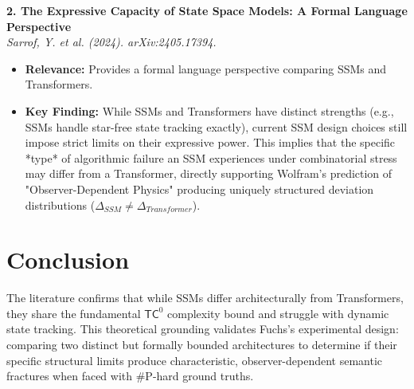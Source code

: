 \documentclass[12pt,a4paper]{article}
\begin{document}
\vspace{1em}
\noindent\textbf{2. The Expressive Capacity of State Space Models: A Formal Language Perspective}\\
\textit{Sarrof, Y. et al. (2024). arXiv:2405.17394.}
\begin{itemize}
    \item \textbf{Relevance:} Provides a formal language perspective comparing SSMs and Transformers.
    \item \textbf{Key Finding:} While SSMs and Transformers have distinct strengths (e.g., SSMs handle star-free state tracking exactly), current SSM design choices still impose strict limits on their expressive power. This implies that the specific *type* of algorithmic failure an SSM experiences under combinatorial stress may differ from a Transformer, directly supporting Wolfram's prediction of "Observer-Dependent Physics" producing uniquely structured deviation distributions ($\Delta_{SSM} \neq \Delta_{Transformer}$).
\end{itemize}

\section{Conclusion}

The literature confirms that while SSMs differ architecturally from Transformers, they share the fundamental $\mathsf{TC}^0$ complexity bound and struggle with dynamic state tracking. This theoretical grounding validates Fuchs's experimental design: comparing two distinct but formally bounded architectures to determine if their specific structural limits produce characteristic, observer-dependent semantic fractures when faced with \#P-hard ground truths.
\end{document}
